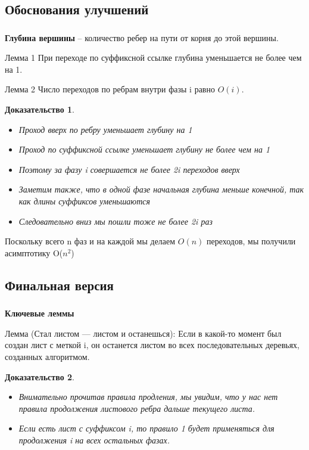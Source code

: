 \documentclass[t]{beamer}  %
\newtheorem{rproof}{Доказательство}
\begin{document}
\subsection{Обоснования улучшений}
\begin{frame}[shrink=12]	
	\frametitle{\insertsubsection}
	
	\textbf{Глубина вершины} -- количество ребер на пути от корня до этой вершины.
	
	\begin{block}{Лемма 1}
		При переходе по суффиксной ссылке глубина уменьшается не более чем на 1.
	\end{block}
	
	\begin{block}{Лемма 2}
		Число переходов по ребрам внутри фазы i равно $O(i)$.
	\end{block}
	\begin{rproof}
		\begin{itemize}
			\pause
			\item Проход вверх по ребру уменьшает глубину на 1
			\pause
			\item Проход по суффиксной ссылке уменьшает глубину не более чем на 1
			\pause
			\item Поэтому за фазу i совершается не более 2i переходов вверх
			\pause
			\item Заметим также, что в одной фазе начальная глубина меньше конечной, так как длины суффиксов уменьшаются
			\pause
			\item Следовательно вниз мы пошли тоже не более 2i раз
		\end{itemize}
	\end{rproof}

	\pause
	Поскольку всего n фаз и на каждой мы делаем $O(n)$ переходов, мы получили асимптотику O($n^{2}$)
\end{frame}

\subsection{Финальная версия}
\begin{frame}	
	\frametitle{\insertsubsection}

	\textbf{Ключевые леммы}
	\pause
	
	\begin{block}{Лемма (Стал листом — листом и останешься):}
		Если в какой-то момент был создан лист с меткой i, он останется листом во всех последовательных деревьях, созданных алгоритмом.
	\end{block}
	\pause
	\begin{rproof}
		\begin{itemize}	
			\item Внимательно прочитав правила продления, мы увидим, что у нас нет правила продолжения листового ребра дальше текущего листа.
			\pause
			\item Если есть лист с суффиксом i, то правило 1 будет применяться для продолжения i на всех остальных фазах. 
		\end{itemize}
	\end{rproof}	
\end{frame}
\end{document}
